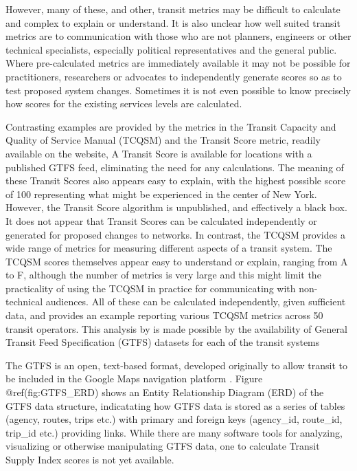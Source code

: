 \documentclass[preprint, 3p,
authoryear]{elsarticle} %
\begin{document}
However, many of these, and other, transit metrics may be difficult to
calculate and complex to explain or understand. It is also unclear how
well suited transit metrics are to communication with those who are not
planners, engineers or other technical specialists, especially political
representatives and the general public. Where pre-calculated metrics are
immediately available it may not be possible for practitioners,
researchers or advocates to independently generate scores so as to test
proposed system changes. Sometimes it is not even possible to know
precisely how scores for the existing services levels are calculated.

Contrasting examples are provided by the metrics in the Transit Capacity
and Quality of Service Manual (TCQSM) and the Transit Score metric,
readily available on the \citet{WalkScore:2023tg} website, A Transit
Score is available for locations with a published GTFS feed, eliminating
the need for any calculations. The meaning of these Transit Scores also
appears easy to explain, with the highest possible score of 100
representing what might be experienced in the center of New York.
However, the Transit Score algorithm is unpublished, and effectively a
black box. It does not appear that Transit Scores can be calculated
independently or generated for proposed changes to networks. In
contrast, the TCQSM provides a wide range of metrics for measuring
different aspects of a transit system. The TCQSM scores themselves
appear easy to understand or explain, ranging from A to F, although the
number of metrics is very large and this might limit the practicality of
using the TCQSM in practice for communicating with non-technical
audiences. All of these can be calculated independently, given
sufficient data, and \citet{Wong:2013aa} provides an example reporting
various TCQSM metrics across 50 transit operators. This analysis by
\citet{Wong:2013aa} is made possible by the availability of General
Transit Feed Specification (GTFS) datasets for each of the transit
systems

The GTFS is an open, text-based format, developed originally to allow
transit to be included in the Google Maps navigation platform
\citep{GTFS}. Figure @ref(fig:GTFS\_ERD) shows an Entity Relationship
Diagram (ERD) of the GTFS data structure, indicatating how GTFS data is
stored as a series of tables (agency, routes, trips etc.) with primary
and foreign keys (agency\_id, route\_id, trip\_id etc.) providing links.
While there are many software tools for analyzing, visualizing or
otherwise manipulating GTFS data, one to calculate Transit Supply Index
scores is not yet available.
\end{document}

